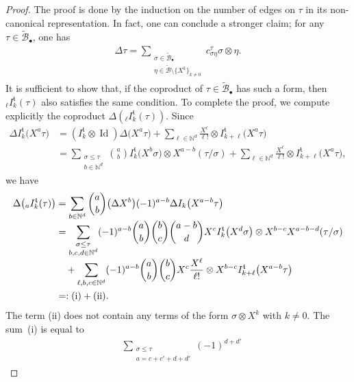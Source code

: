 \documentclass[JEP,XML,SOM,Unicode,published]{cedram}
\newcommand{\sbullet}{{\scriptscriptstyle\bullet}}
\theoremstyle{plain}
\theoremstyle{definition}
\DeclareMathOperator{\iden}{Id}
\newcommand{\bsmcB}{\boldsymbol{\mathcal{B}}}
\newcommand{\frkt}{\mathfrak{t}}
\newcommand{\bbN}{\mathbb{N}}
\newcommand{\mcB}{\mathcal{B}}
\begin{document}
\begin{proof}
The proof is done by the induction on the number of edges on $\tau$ in its non-canonical representation. In fact, one can conclude a stronger claim; for any $\tau\in\widetilde{\mcB}_\sbullet$, one has\vspace*{-3pt}
\begin{align}\label{eq:stronger than D}
\Delta\tau=\sum_{\substack{\sigma\in\widetilde{\mcB}_\sbullet\\ \eta\in \widetilde{\bsmcB}\setminus\{X^k\}_{k\neq0}}} c_{\sigma\eta}^\tau\sigma\otimes\eta.
\end{align}
It is sufficient to show that, if the coproduct of $\tau\in\widetilde{\mcB}_\sbullet$ has such a form, then ${}_{\ell}I_k^\frkt(\tau)$ also satisfies the same condition. To complete the proof, we compute explicitly the coproduct $\Delta( {}_{\ell}I_k^\frkt(\tau))$.
Since\vspace*{-3pt}
\begin{align*}
\Delta I_k^\frkt\bigl(X^a\tau\bigr)
&=(I_k^\frkt\otimes\iden)\Delta\bigl(X^a\tau\bigr)
+\sum_{\ell\in\bbN^d}\frac{X^{\ell}}{\ell!}\otimes I_{k+\ell}^\frkt\bigl(X^a\tau\bigr)\\
&=\sum_{\substack{\sigma\le\tau\\ b\in\bbN^d}}\binom{a}{b}
I_k^\frkt \bigl(X^b\sigma\bigr)\otimes X^{a-b}(\tau/\sigma)
+\sum_{\ell\in\bbN^d}\frac{X^{\ell}}{\ell!}\otimes I_{k+\ell}^\frkt\bigl(X^a\tau\bigr),
\end{align*}
we have\vspace*{-3pt}
\begin{align*}
\Delta\bigl({}_{a} I_k^\frkt(\tau)\bigr)
&=\sum_{b\in\bbN^d}\binom{a}{b}
\bigl(\Delta X^b\bigr)(-1)^{a-b}\Delta I_k\bigl(X^{a-b}\tau\bigr)\\[-3pt]
&=\sum_{\substack{\sigma\le\tau\\ b,c,d\in\bbN^d}}(-1)^{a-b}
\binom{a}{b}\binom{b}{c}\binom{a-b}{d}
X^c I_k^\frkt\bigl(X^d\sigma\bigr)
\otimes
X^{b-c} X^{a-b-d}(\tau/\sigma)\\[-3pt]
&\quad+\sum_{\ell,b,c\in\bbN^d}(-1)^{a-b}\binom{a}{b}\binom{b}{c}
X^c\frac{X^\ell}{\ell!}
\otimes
X^{b-c}I_{k+\ell}^\frkt\bigl(X^{a-b}\tau\bigr)\\
&=:(\textup{i})+(\textup{ii}).
\end{align*}
The term (ii) does not contain any terms of the form $\sigma\otimes X^k$ with $k\neq0$. The sum~(i) is equal to\vspace*{-3pt}
\begin{align*}
&\sum_{\substack{\sigma\le\tau \\ a=c+c'+d+d'}}(-1)^{d+d'}

\end{align*}
\end{proof}
\end{document}
